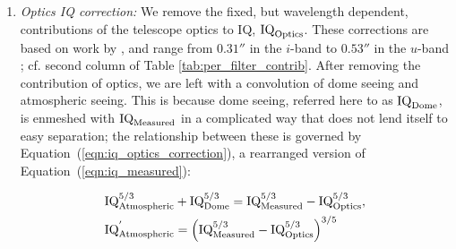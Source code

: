 \begin{enumerate}
\item \textit{Optics IQ correction:} We remove the fixed, but wavelength dependent, contributions of the telescope optics to IQ, $\textrm{IQ}_{\textrm{Optics}}$. These corrections are based on work by \cite{salmon2009cfht}, and range from $0.31''$ in the $i$-band to $0.53''$ in the $u$-band \citep{racine2018}; cf. second column of Table \ref{tab:per_filter_contrib}. 
After removing the contribution of optics, we are  left with a convolution of dome seeing and atmospheric seeing. This is because dome seeing, referred here to as ${\rm IQ}_{\rm Dome}$, is enmeshed with ${\rm IQ}_{\rm Measured}$ in a complicated way that does not lend itself to easy separation; the relationship between these is governed by Equation~(\ref{eqn:iq_optics_correction}), a rearranged version of Equation~(\ref{eqn:iq_measured}):

\begin{align}
&\textrm{IQ}_{\textrm{Atmospheric}}^{5/3} + \textrm{IQ}_{\textrm{Dome}}^{5/3} = \textrm{IQ}_{\textrm{Measured}}^{5/3} - \textrm{IQ}_{\textrm{Optics}}^{5/3}, \nonumber \\
&\rm{IQ}_{\rm Atmospheric}^{'} = \left(\textrm{IQ}_{\textrm{Measured}}^{5/3} - \textrm{IQ}_{\textrm{Optics}}^{5/3}\right)^{3/5}
\label{eqn:iq_optics_correction}
\end{align}



\end{enumerate}
